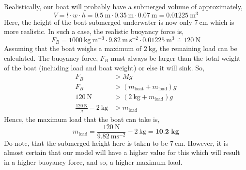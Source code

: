 \documentclass{article}
\begin{document}
Realistically, our boat will probably have a submerged volume of approximately,
$$V=l\cdot w\cdot h=0.5\ \mathrm{m}\cdot 0.35\ \mathrm{m}\cdot 0.07\ \mathrm{m}=0.01225\ \mathrm{m^3}$$
Here, the height of the boat submerged underwater is now only $7\ \mathrm{cm}$ which is more realistic. In such a case, the realistic buoyancy force is,
$$F_B=1000\ \mathrm{kg\ m^{-3}}\cdot9.82\ \mathrm{m\ s^{-2}}\cdot0.01225\ \mathrm{m^3}\doteq120\ \mathrm{N}$$
Assuming that the boat weighs a maximum of $2\ \mathrm{kg}$, the remaining load can be calculated. The buoyancy force, $F_B$ must always be larger than the total weight of the boat (including load and boat weight) or else it will sink. So,
\begin{align*}
    F_B&>Mg \\ 
    F_B&>(m_{\mathrm{boat}}+m_{\mathrm{load}})g \\
    120\ \mathrm{N}&>(2\ \mathrm{kg}+m_{\mathrm{load}})g \\
    \frac{120\ \mathrm{N}}{g}-2\ \mathrm{kg}&>m_{\mathrm{load}}
\end{align*}
Hence, the maximum load that the boat can take is,
$$m_{\mathrm{load}}=\frac{120\ \mathrm{N}}{9.82\ \mathrm{m s^{-2}}}-2\ \mathrm{kg}=\textbf{10.2 kg}$$
Do note, that the submerged height here is taken to be $7\ \mathrm{cm}$. However, it is almost certain that our model will have a higher value for this which will result in a higher buoyancy force, and so, a higher maximum load.
\end{document}
